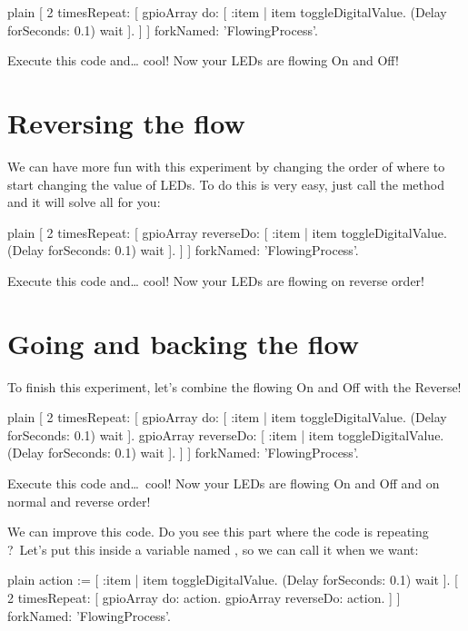\documentclass[10pt,twoside,english]{_support/latex/sbabook/sbabook}
\begin{document}
\begin{displaycode}{plain}
[ 2 timesRepeat: [
    gpioArray do: [ :item | item toggleDigitalValue. (Delay forSeconds: 0.1) wait ].
] ] forkNamed: 'FlowingProcess'.
\end{displaycode}

Execute this code and… cool! Now your LEDs are flowing On and Off!
\section{Reversing the flow}
We can have more fun with this experiment by changing the order of where to start changing the value of LEDs. To do this is very easy, just call the method  and it will solve all for you:

\begin{displaycode}{plain}
[ 2 timesRepeat: [
    gpioArray reverseDo: [ :item | item toggleDigitalValue. (Delay forSeconds: 0.1) wait ].
] ] forkNamed: 'FlowingProcess'.
\end{displaycode}

Execute this code and… cool! Now your LEDs are flowing on reverse order!
\section{Going and backing the flow}
To finish this experiment, let’s combine the flowing On and Off with the Reverse!

\begin{displaycode}{plain}
[ 2 timesRepeat: [
    gpioArray do: [ :item | item toggleDigitalValue. (Delay forSeconds: 0.1) wait ].
    gpioArray reverseDo: [ :item | item toggleDigitalValue. (Delay forSeconds: 0.1) wait ].
] ] forkNamed: 'FlowingProcess'.
\end{displaycode}

Execute this code and… cool! Now your LEDs are flowing On and Off and on normal and reverse order!

We can improve this code. Do you see this part where the code is repeating  ? Let's put this inside a variable named , so we can call it when we want:

\begin{displaycode}{plain}
action := [ :item | item toggleDigitalValue. (Delay forSeconds: 0.1) wait ].
[ 2 timesRepeat: [
    gpioArray do: action.
    gpioArray reverseDo: action.
] ] forkNamed: 'FlowingProcess'.
\end{displaycode}
\end{document}

